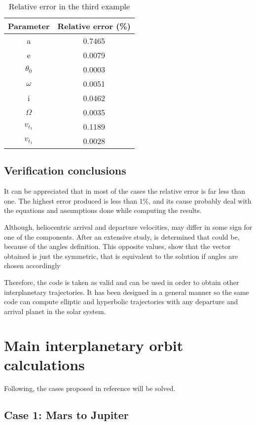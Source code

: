 \begin{table}[H]
\centering
\begin{tabular}{|cc|}
\hline
\textbf{Parameter}   & \textbf{Relative error (\%)} \\ \hline
a           & 0.7465              \\
e           & 0.0079              \\
$\theta _0$ & 0.0003              \\
$\omega$    & 0.0051              \\
i           & 0.0462              \\
$\Omega$    & 0.0035              \\
$v_{t_1}$   & 0.1189              \\
$v_{t_1}$   & 0.0028              \\ \hline
\end{tabular}
\caption{Relative error in the third example}
\end{table}
\subsection{Verification conclusions}
It can be appreciated that in most of the cases the relative error is far less than one. The highest error produced is less than 1\%, and its cause probably deal with the equations and assumptions done while computing the results.

Although, heliocentric arrival and departure velocities, may differ in some sign for one of the components. After an extensive study, is determined that could be, because of the angles definition. This opposite values, show that the vector obtained is just the symmetric, that is equivalent to the solution if angles are chosen accordingly

Therefore, the code is taken as valid and can be used in order to obtain other interplanetary trajectories. It has been designed in a general manner so the same code can compute elliptic and hyperbolic trajectories with any departure and arrival planet in the solar system. 

\section{Main interplanetary orbit calculations}
Following, the cases proposed in reference \cite{CalafEnunciat} will be solved. 
\subsection{Case 1: Mars to Jupiter}


